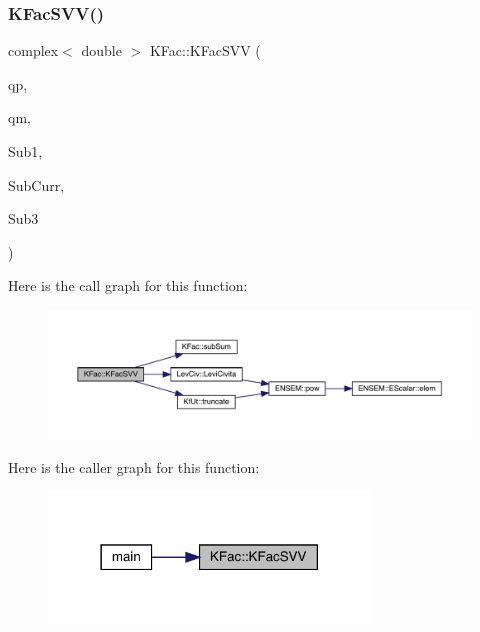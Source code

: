 \subsubsection{\texorpdfstring{KFacSVV()}{KFacSVV()}}
{\footnotesize\ttfamily complex$<$ double $>$ K\+Fac\+::\+K\+Fac\+S\+VV (\begin{DoxyParamCaption}\item[{Eigen\+::\+Vector\+Xd \&}]{qp,  }\item[{Eigen\+::\+Vector\+Xd \&}]{qm,  }\item[{map$<$ int, Eigen\+::\+Matrix\+Xcd $>$ \&}]{Sub1,  }\item[{map$<$ int, Eigen\+::\+Matrix\+Xcd $>$ \&}]{Sub\+Curr,  }\item[{map$<$ int, Eigen\+::\+Matrix\+Xcd $>$ \&}]{Sub3 }\end{DoxyParamCaption})}

Here is the call graph for this function\+:
\nopagebreak
\begin{figure}[H]
\begin{center}
\leavevmode
\includegraphics[width=350pt]{d2/d89/namespaceKFac_a02b5c2876eea15ce628ac7cc58a4b746_cgraph}
\end{center}
\end{figure}
Here is the caller graph for this function\+:
\nopagebreak
\begin{figure}[H]
\begin{center}
\leavevmode
\includegraphics[width=242pt]{d2/d89/namespaceKFac_a02b5c2876eea15ce628ac7cc58a4b746_icgraph}
\end{center}
\end{figure}
\mbox{\label{namespaceKFac_a2f18ad8b36ac24cc9534755cccb8c780}} 
